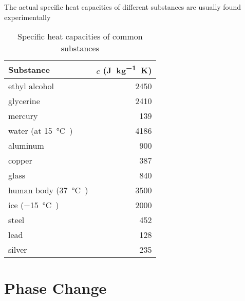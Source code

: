 %
%
%
%
%
%
%  
The actual specific heat capacities of different substances are usually
found experimentally
%
\begin{table}[ht]
  \centering
  \begin{tabular}{|l|r|}
    \hline
    \rowcolor{pink}
    \textbf{Substance} & $c$ (\si{\joule\per\kilo\gram.\kelvin}) \\
    \hline
    ethyl alcohol & 2450 \\
    glycerine     & 2410 \\
    mercury       & 139 \\
    water (at \SI{15}\celsius) & 4186 \\
    \hline
    aluminum & 900 \\
    copper   & 387 \\
    glass    & 840 \\
    human body (\SI{37}\celsius) & 3500 \\
    ice (\SI{-15}\celsius)       & 2000 \\
    steel    & 452 \\
    lead     & 128 \\
    silver   & 235 \\
    \hline
  \end{tabular}
  \caption{Specific heat capacities of common substances}
  \label{tabl:specific-heat-capacity}
\end{table} 


\section{Phase Change}

